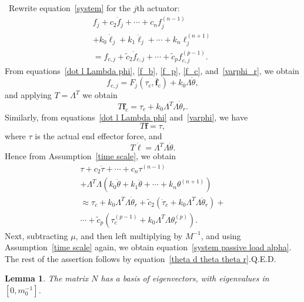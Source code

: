 \documentclass[reqno,twocolumn]{amsart}
\newtheorem{lemma}{Lemma}
\renewcommand{\mathsf}{}
\begin{document}
\bigskip{} \ Rewrite equation~\eqref{system} for the $j$th actuator:
\begin{multline}
\label{system for jth}
f_j + c_2 \dot f_j + \cdots + c_n f_j^{(n-1)} \\
+ k_0 \dot \ell_j + k_1 \ddot \ell_j + \cdots + k_n \ell_j^{(n+1)} \\
= f_{c,j} + \tilde c_2 \dot f_{c,j} + \cdots + \tilde c_p f_{c,j}^{(p-1)}.
\end{multline}
From equations~\eqref{dot l Lambda phi}, \eqref{f_b}, \eqref{f_p}, \eqref{f_c}, and~\eqref{varphi_r}, we obtain
\begin{equation}
f_{c,j} = \mathsf F_j(\tau_c, \bar{\bm f}_c) + k_0 \Lambda \dot\theta,
\end{equation}
and applying $\mathsf T = \mathsf \Lambda^T$ we obtain
\begin{equation}
\mathsf T \bm f_c = \tau_c + k_0 \mathsf \Lambda^T \mathsf \Lambda \dot\theta_r .
\end{equation}
Similarly, from equations~\eqref{dot l Lambda phi} and~\eqref{varphi}, we have
\begin{equation}
\mathsf T \bm f = \tau,
\end{equation}
where $\tau$ is the actual end effector force, and
\begin{equation}
\mathsf T \dot{\bm \ell} = \mathsf \Lambda^T \mathsf \Lambda \dot\theta .
\end{equation}
Hence from Assumption~\ref{time scale}, we obtain
\begin{multline}
\tau + c_2 \dot \tau + \cdots + c_n \tau^{(n-1)} \\
+ \mathsf\Lambda^T \mathsf\Lambda (k_0 \dot\theta + k_1 \ddot\theta + \cdots + k_n \theta^{(n+1)}) \\
\approx  \tau_c + k_0 \mathsf\Lambda^T \mathsf\Lambda \dot\theta_r
+ \tilde c_2 (\dot\tau_c + k_0 \mathsf\Lambda^T \mathsf\Lambda \ddot\theta_r)
+ \\
\cdots + \tilde c_p (\tau_c^{(p-1)} + k_0 \mathsf\Lambda^T \mathsf\Lambda \theta_r^{(p)}) .
\end{multline}
Next, subtracting $\mu$, and then left multiplying by $\mathsf M^{-1}$, and using Assumption~\ref{time scale} again, we obtain equation~\eqref{system passive load alpha}.  The rest of the assertion follows by equation~\eqref{theta d theta theta r}.\hfill Q.E.D.

\begin{lemma}
\label{eig}
The matrix $\mathsf N$ has a basis of eigenvectors, with eigenvalues in $[0,m_0^{-1}]$.
\end{lemma}
\end{document}
